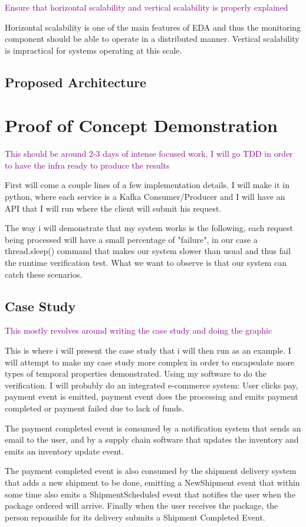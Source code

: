 \documentclass{article}
\newcommand{\note}[1] {
	\textcolor{Purple}{#1}

}
\begin{document}
\note{Ensure that horizontal scalability and vertical scalability is properly explained}
\par
Horizontal scalability is one of the main features of EDA and thus the monitoring component should be able to operate in a distributed manner.
Vertical scalability is impractical for systems operating at this scale.
\subsection{Proposed Architecture}
\section{Proof of Concept Demonstration}
\note{This should be around 2-3 days of intense focused work, I will go TDD in order to have the infra ready to produce the results}
First will come a couple lines of a few implementation details. I will make it in python, where each service is a Kafka Consumer/Producer and I will have an API that I will run where the client will submit his request.

The way i will demonstrate that my system works is the following, each request being processed will have a small percentage of "failure", in our case a thread.sleep() command that makes our system slower than usual and thus fail the runtime verification test. What we want to observe is that our system can catch these scenarios.
\subsection{Case Study}
\note{This mostly revolves around writing the case study and doing the graphic}
This is where i will present the case study that i will then run as an example.
I will attempt to make my case study more complex in order to encapsulate more types of temporal properties demonstrated.
Using my software to do the verification. I will probably do an integrated e-commerce system: User clicks pay, payment event is emitted, payment event does the processing and emits payment completed or payment failed due to lack of funds.

The payment completed event is consumed by a notification system that sends an email to the user, and by a supply chain software that updates the inventory and emits an inventory update event.

The payment completed event is also consumed by the shipment delivery system that adds a new shipment to be done, emitting a NewShipment event that within some time also emits a ShipmentScheduled event that notifies the user when the package ordered will arrive. Finally when the user receives the package, the person reponsible for its delivery submits a Shipment Completed Event.
\end{document}
